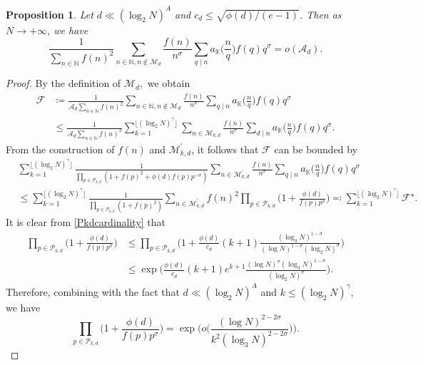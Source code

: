 \documentclass[12pt,reqno]{amsart}
\newtheorem{prop}{Proposition}[section]
\theoremstyle{definition}
\numberwithin{equation}{section}
\newcommand{\mbk}{\mathbb{K}}
\newcommand{\mbn}{\mathbb{N}}
\newcommand{\mca}{\mathcal{A}}
\newcommand{\mcf}{\mathcal{F}}
\newcommand{\mcp}{\mathcal{P}}
\newcommand{\mcm}{\mathcal{M}}
\begin{document}
\begin{prop}
    \label{prop42}
    Let $d \ll (\log_2 N)^A$ and $c_d \le \sqrt{\phi(d)/(e-1)}$. Then     as $N \to +\infty$, we have
    $$
    \frac{1}{\sum_{n \in \mbn} f(n)^2} \sum_{n \in \mbn, n \notin \mcm_d} \frac{f(n)}{n^{\sigma}} \sum_{q \mid n} a_\mbk \Big( \frac{n}{q}\Big)f(q)q^{\sigma}=o(\mca_d).
    $$
\end{prop}
\begin{proof}
By the definition of $\mcm_d,$ we obtain
\begin{align*}
\mcf &\coloneqq \frac{1}{\mca_d \sum_{n\in\mbn} f(n)^2} \sum_{n\in\mbn, n\notin\mcm_d} \frac{f(n)}{n^{\sigma}} \sum_{q\mid n}a_\mbk \Big( \frac{n}{q}\Big)f(q)q^{\sigma} \\
&\le \frac{1}{\mca_d \sum_{n\in\mbn} f(n)^2} \sum_{k = 1}^{\lfloor(\log_2 N)^{\gamma}\rfloor} \sum_{n\in\mcm_{k,d}} \frac{f(n)}{n^{\sigma}} \sum_{d\mid n} a_\mbk \Big( \frac{n}{q}\Big)f(q)q^{\sigma}.
\end{align*}
From the construction of $f(n)$ and $\mcm_{k,d}^{\prime}$, it follows that $\mcf$ can be bounded by
\begin{align*}
&\sum_{k = 1}^{\lfloor(\log_2 N)^{\gamma}\rfloor} \frac{1}{\prod_{p\in \mcp_{k,d}} (1 + f(p)^2 + \phi(d)f(p)p^{-\sigma})} \sum_{n\in\mcm^{\prime}_{k,d}} \frac{f(n)}{n^{\sigma}} \sum_{q\mid n} a_\mbk \Big( \frac{n}{q}\Big)f(q)q^{\sigma} \\
&\le \sum_{k = 1}^{\lfloor(\log_2 N)^{\gamma}\rfloor} \frac{1}{\prod_{p\in \mcp_{k,d}} (1 + f(p)^2)} \sum_{n\in\mcm^{\prime}_{k,d}} f(n)^2 \prod_{p\in \mcp_{k,d}} \Big(1 + \frac{\phi(d)}{f(p)p^{\sigma}}\Big) \eqqcolon \sum_{k = 1}^{\lfloor(\log_2 N)^{\gamma}\rfloor}  \mcf^{\star}.
\end{align*}
It is clear from \eqref{Pkdcardinality} that 
\begin{align*}
\prod_{p\in \mcp_{k,d}} \Big(1 + \frac{\phi(d)}{f(p)p^{\sigma}}\Big)& \le \prod_{p\in \mcp_{k,d}} \bigg(1 + \frac{\phi(d)}{c_d}(k+1)\frac{(\log_3 N)^{1-\sigma}}{(\log N)^{1-\sigma}(\log_2 N)^{\sigma}}\bigg)  \\
&\le \exp\bigg(\frac{\phi(d)}{c_d}(k + 1)e^{k + 1}\frac{(\log N)^{\sigma}(\log_3 N)^{1-\sigma}}{(\log_2 N)^{\sigma}}\bigg).
\end{align*}
Therefore, combining with the fact that $d \ll ( \log_2 N)^A$ and $k \le (\log_2 N)^{\gamma}$, we have 
$$
\prod_{p\in \mcp_{k,d}} \Big(1 + \frac{\phi(d)}{f(p)p^{\sigma}}\Big) =\exp\bigg(o\bigg(\frac{(\log N)^{2-2\sigma}}{k^2 (\log_3 N)^{2-2\sigma}}\bigg)\bigg).
$$
\par

\end{proof}
\end{document}
